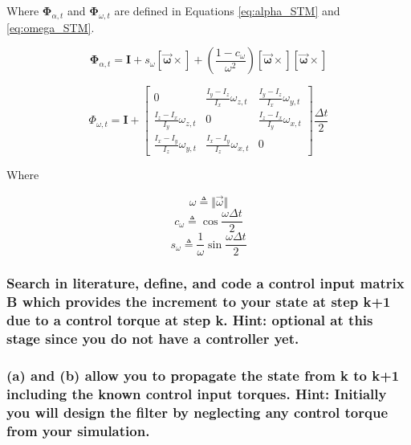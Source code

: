Where $\boldsymbol{\Phi}_{\alpha,t}$ and $\boldsymbol{\Phi}_{\omega,t}$ are defined in Equations \ref{eq:alpha_STM} and \ref{eq:omega_STM}.

\begin{equation} \label{eq:alpha_STM}
    \boldsymbol{\Phi}_{\alpha,t} = \boldsymbol{I} + s_{\omega} \boldsymbol{\left[ \vec{\omega} \times \right]} + \left( \frac{1 - c_{\omega}}{\omega ^2} \right) \boldsymbol{\left[ \vec{\omega} \times \right]} \boldsymbol{\left[ \vec{\omega} \times \right]}
\end{equation}

\begin{equation} \label{eq:omega_STM}
    \Phi_{\omega,t} = \boldsymbol{I} + \begin{bmatrix}
        0 & \frac{I_y - I_z}{I_x} \omega_{z,t} & \frac{I_y - I_z}{I_x} \omega_{y,t} \\
        \frac{I_z - I_x}{I_y} \omega_{z,t} & 0 & \frac{I_z - I_x}{I_y} \omega_{x,t} \\
        \frac{I_x - I_y}{I_z} \omega_{y,t} & \frac{I_x - I_y}{I_z} \omega_{x,t} & 0
    \end{bmatrix} \frac{\Delta t}{2}
\end{equation}

Where

\begin{equation*}
    \omega \triangleq \Vert \vec{\omega} \Vert
\end{equation*}
\begin{equation*}
    c_{\omega} \triangleq \cos{\frac{\omega \Delta t}{2}}
\end{equation*}
\begin{equation*}
    s_{\omega} \triangleq \frac{1}{\omega} \sin{\frac{\omega \Delta t}{2}}
\end{equation*}



\subsubsection{Search in literature, define, and code a control input matrix B which provides the increment to your state at step k+1 due to a control torque at step k. Hint: optional at this stage since you do not have a controller yet.}


\subsubsection{(a) and (b) allow you to propagate the state from k to k+1 including the known control input torques. Hint: Initially you will design the filter by neglecting any control torque from your simulation.}

